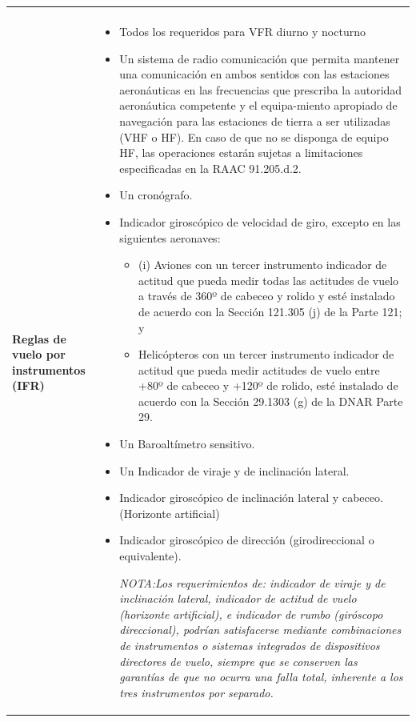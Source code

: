 \begin{longtable}{m{0.25\textwidth}m{0.75\textwidth}}
{}
\\ %
\parbox{\linewidth}{\bf Reglas de vuelo por \\ instrumentos (IFR)}
& {\scriptsize
  \begin{itemize}
  \item Todos los requeridos para VFR diurno y nocturno
  \item Un sistema de radio comunicación que permita mantener una comunicación en ambos sentidos con las estaciones aeronáuticas en las frecuencias que prescriba la autoridad aeronáutica competente y el equipa-miento apropiado de navegación para las estaciones de tierra a ser utilizadas (VHF o HF). En caso de que no se disponga de equipo HF, las operaciones estarán sujetas a limitaciones especificadas en la RAAC 91.205.d.2.
  \item Un cronógrafo.
  \item Indicador giroscópico de velocidad de giro, excepto en las siguientes aeronaves:
    \begin{itemize}
    \item (i) Aviones con un tercer instrumento indicador de actitud
      que pueda medir todas las actitudes de vuelo a través de 360º de
      cabeceo y rolido y esté instalado de acuerdo con la Sección
      121.305 (j) de la Parte 121; y
    \item Helicópteros con un tercer
      instrumento indicador de actitud que pueda medir actitudes de
      vuelo entre +80º de cabeceo y +120º de rolido, esté instalado
      de acuerdo con la Sección 29.1303 (g) de la DNAR Parte 29.
    \end{itemize}
  \item Un Baroaltímetro sensitivo.
  \item Un Indicador de viraje y de inclinación lateral.
  \item Indicador giroscópico de inclinación lateral y cabeceo. (Horizonte artificial)
  \item Indicador giroscópico de dirección (girodireccional o equivalente).

{\it NOTA:Los  requerimientos  de:  indicador  de  viraje  y  de  inclinación  lateral,  indicador  de  actitud  de  vuelo  (horizonte  artificial),  e  indicador  de  rumbo  (giróscopo  direccional),  podrían  satisfacerse  mediante  combinaciones de instrumentos o sistemas integrados de dispositivos directores de vuelo, siempre que se conserven las garantías de que no ocurra una falla total, inherente a los tres instrumentos por separado.}


\end{itemize}}
\end{longtable}
